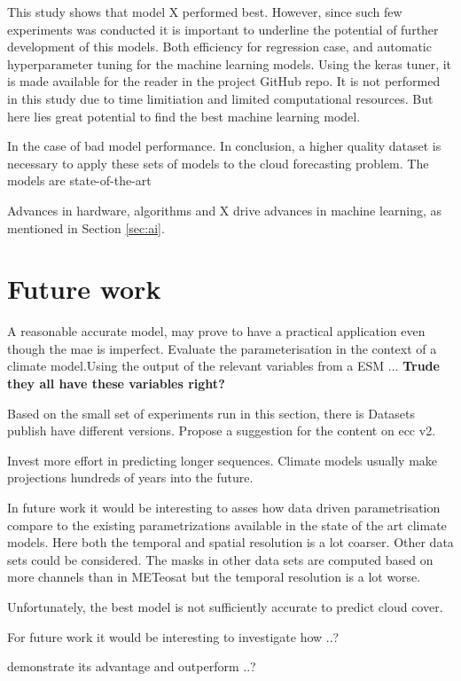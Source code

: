 This study shows that model X performed best. However, since such few experiments was conducted it is important to underline the potential of further development of this models. Both efficiency for regression case, and automatic hyperparameter tuning for the machine learning models. Using the keras tuner, it is made available for the reader in the project GitHub repo. It is not performed in this study due to time limitiation and limited computational resources. But here lies great potential to find the best machine learning model. 

In the case of bad model performance. In conclusion, a higher quality dataset is necessary to apply these sets of models to the cloud forecasting problem. The models are state-of-the-art 

Advances in hardware, algorithms and X drive advances in machine learning, as mentioned in Section \ref{sec:ai}. %

\section{Future work}
A reasonable accurate model, may prove to have a practical application even though the \acrshort{mae} is imperfect. Evaluate the parameterisation in the context of a climate model.Using the output of the relevant variables from a \acrshort{ESM} ... \textbf{Trude they all have these variables right?}

Based on the small set of experiments run in this section, there is 
Datasets publish have different versions. Propose a suggestion for the content on \acrshort{ecc} v2.

Invest more effort in predicting longer sequences. Climate models usually make projections hundreds of years into the future.

In future work it would be interesting to asses how data driven parametrisation compare to the existing parametrizations available in the state of the art climate models. Here both the temporal and spatial resolution is a lot coarser. Other data sets could be considered. The masks in other data sets are computed based on more channels than in METeosat but the temporal resolution is a lot worse. 

Unfortunately, the best model is not sufficiently accurate to predict cloud cover. 

For future work it would be interesting to investigate how ..?

demonstrate its advantage and outperform ..?